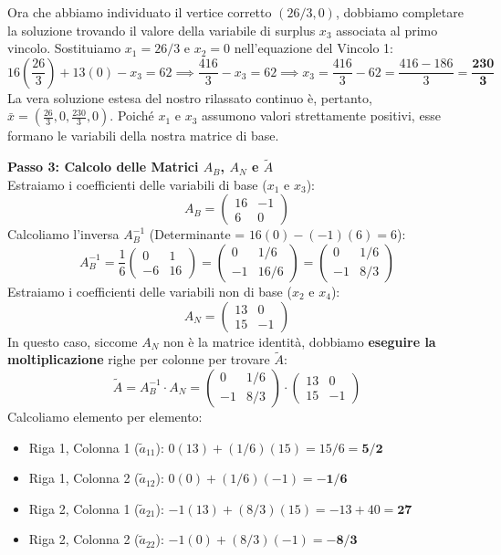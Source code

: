 \documentclass[12pt, a4paper]{article}
\begin{document}
	Ora che abbiamo individuato il vertice corretto $(26/3, 0)$, dobbiamo completare la soluzione trovando il valore della variabile di surplus $x_3$ associata al primo vincolo. Sostituiamo $x_1 = 26/3$ e $x_2 = 0$ nell'equazione del Vincolo 1:
	\[
	16\left(\frac{26}{3}\right) + 13(0) - x_3 = 62 \implies \frac{416}{3} - x_3 = 62 \implies x_3 = \frac{416}{3} - 62 = \frac{416 - 186}{3} = \mathbf{\frac{230}{3}}
	\]
	La vera soluzione estesa del nostro rilassato continuo è, pertanto, $\bar{x} = \left( \frac{26}{3}, 0, \frac{230}{3}, 0 \right)$. 
	Poiché $x_1$ e $x_3$ assumono valori strettamente positivi, esse formano le variabili della nostra matrice di base.
	
	\vspace{0.4cm}
	\textbf{Passo 3: Calcolo delle Matrici $A_B$, $A_N$ e $\tilde{A}$}\\
	Estraiamo i coefficienti delle variabili di base ($x_1$ e $x_3$):
	\[
	A_B = \begin{pmatrix} 16 & -1 \\ 6 & 0 \end{pmatrix}
	\]
	Calcoliamo l'inversa $A_B^{-1}$ (Determinante = $16(0) - (-1)(6) = 6$):
	\[
	A_B^{-1} = \frac{1}{6} \begin{pmatrix} 0 & 1 \\ -6 & 16 \end{pmatrix} = \begin{pmatrix} 0 & 1/6 \\ -1 & 16/6 \end{pmatrix} = \begin{pmatrix} 0 & 1/6 \\ -1 & 8/3 \end{pmatrix}
	\]
	Estraiamo i coefficienti delle variabili non di base ($x_2$ e $x_4$):
	\[
	A_N = \begin{pmatrix} 13 & 0 \\ 15 & -1 \end{pmatrix}
	\]
	In questo caso, siccome $A_N$ non è la matrice identità, dobbiamo \textbf{eseguire la moltiplicazione} righe per colonne per trovare $\tilde{A}$:
	\[
	\tilde{A} = A_B^{-1} \cdot A_N = \begin{pmatrix} 0 & 1/6 \\ -1 & 8/3 \end{pmatrix} \cdot \begin{pmatrix} 13 & 0 \\ 15 & -1 \end{pmatrix}
	\]
	Calcoliamo elemento per elemento:
	\begin{itemize}[label=$\circ$, itemsep=2pt, leftmargin=1.5cm]
		\item Riga 1, Colonna 1 ($\tilde{a}_{11}$): $0(13) + (1/6)(15) = 15/6 = \mathbf{5/2}$
		\item Riga 1, Colonna 2 ($\tilde{a}_{12}$): $0(0) + (1/6)(-1) = \mathbf{-1/6}$
		\item Riga 2, Colonna 1 ($\tilde{a}_{21}$): $-1(13) + (8/3)(15) = -13 + 40 = \mathbf{27}$
		\item Riga 2, Colonna 2 ($\tilde{a}_{22}$): $-1(0) + (8/3)(-1) = \mathbf{-8/3}$
	\end{itemize}
\end{document}
